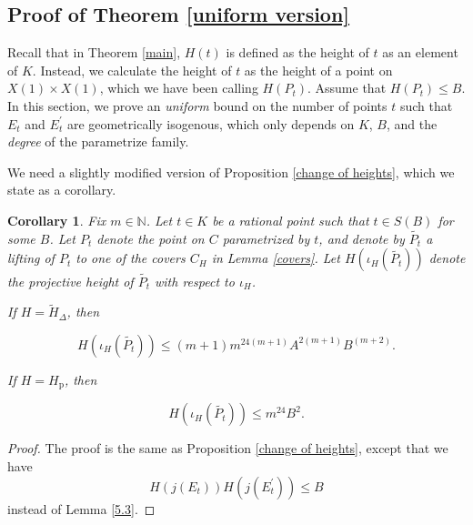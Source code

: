 \documentclass[12pt]{amsart}
\newtheorem{cor}[thm]{Corollary}
\theoremstyle{definition}
\theoremstyle{remark}
\numberwithin{equation}{section}
\newcommand{\N}{\mathbb{N}}
\begin{document}
\subsection{Proof of Theorem \ref{uniform version}}

Recall that in Theorem \ref{main}, $H(t)$ is defined as the height of $t$ as an element of $K$. Instead, we calculate the height of $t$ as the height of a point on $X(1) \times X(1)$, which we have been calling $H(P_{t})$. Assume that $H(P_t) \le  B$. In this section, we prove an \textit{uniform} bound on the number of points $t$ such that $E_t$ and $E^{\prime}_t$ are geometrically isogenous, which only depends on $K$, $B$, and the \textit{degree} of the parametrize family.

We need a slightly modified version of Proposition \ref{change of heights}, which we state as a corollary.
\begin{cor}\label{corollary of change of heights}
	Fix $m \in \N$. Let $t \in K$ be a rational point such that $t \in S(B)$ for some $B$. Let $P_{t}$ denote the point on $C$ parametrized by $t$, and denote by $\tilde{P_{t}}$ a lifting of $P_{t}$ to one of the covers $C_H$ in Lemma \ref{covers}. Let $H(\iota_{H}(\tilde{P_{t}}))$ denote the projective height of $\tilde{P_{t}}$ with respect to $\iota_{H}$. 

If $H=\tilde{H}_{\Delta}$, then 

 $$H(\iota_{H}(\tilde{P_{t}})) \le (m+1)m^{24(m+1)}A^{2(m+1)}B^{(m+2)} .$$	

 
 If $H=H_{\operatorname{p}}$, then 

 $$H(\iota_{H}(\tilde{P_{t}})) \le  m^{24}B^{2} .$$	


\end{cor}

\begin{proof}
	The proof is the same as Proposition \ref{change of heights}, except that we have 
	$$H(j(E_{t}))H(j(E_{t}^{\prime})) \le B$$
	instead of Lemma \ref{5.3}.
\end{proof}
\end{document}
